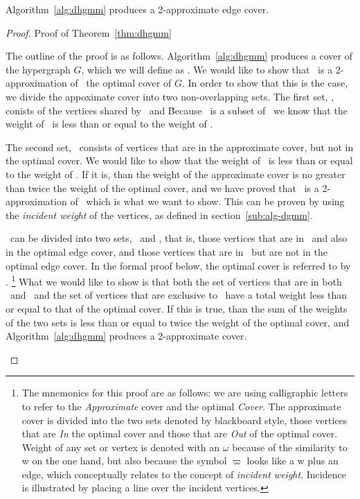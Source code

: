 

\begin{thm}
  Algorithm~\ref{alg:dhgmm} produces a 2-approximate edge cover.
  \label{thm:dhgmm}
\end{thm}
\begin{proof}{Proof of Theorem~\ref{thm:dhgmm}}
  \begin{smy}
    The outline of the proof is as follows. Algorithm~\ref{alg:dhgmm} produces a cover of the hypergraph $G$, which we will define as \cAd. We would like to show that \cAd\ is a 2-approximation of \cCd\, the optimal cover of $G$. In order to show that this is the case, we divide the appoximate cover into two non-overlapping sets. The first set, \bId, conists of the vertices shared by \cAd\ and \cCd\. Because \bId\ is a subset of \cCd\, we know that the weight of \bId\ is less than or equal to the weight of \cCd. 

The second set, \bOd\, consists of vertices that are in the approximate cover, but not in the optimal cover. We would like to show that the weight of \bOd\ is less than or equal to the weight of \cCd. If it is, than the weight of the approximate cover is no greater than twice the weight of the optimal cover, and we have proved that \cAd\ is a 2-approximation of \cCd\, which is what we want to show. This can be proven by using the {\em incident weight} of the vertices, as defined in section~\ref{sub:alg-dgmm}. 

\cAd\ can be divided into two sets, \bId\ and \bOd, that is, those vertices that are in \cAd\ and also in the optimal edge cover, and those vertices that are in \cAd\ but are not in the optimal edge cover. In the formal proof below, the optimal cover is referred to by \cCd. \footnote{The mnemonics for this proof are as follows: we are using calligraphic letters to refer to the {\em Approximate} cover and the optimal {\em Cover}. The approximate cover is divided into the two sets denoted by blackboard style, those vertices that are {\em In} the optimal cover and those that are {\em Out} of the optimal cover. Weight of any set or vertex is denoted with an $\omega$ because of the similarity to w on the one hand, but also because the symbol $\varpi$ looks like a w plus an edge, which conceptually relates to the concept of {\em incident weight}. Incidence is illustrated by placing a line over the incident vertices.} What we would like to show is that both the set of vertices that are in both \cAd\ and \cCd\ and the set of vertices that are exclusive to \cAd\ have a total weight less than or equal to that of the optimal cover. If this is true, than the sum of the weights of the two sets is less than or equal to twice the weight of the optimal cover, and Algorithm~\ref{alg:dhgmm} produces a 2-approximate cover.
  \end{smy}
    

\end{proof}
